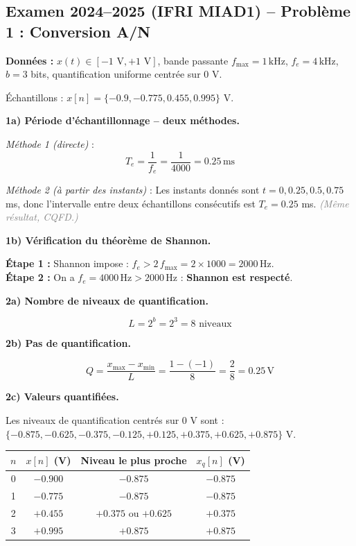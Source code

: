 \documentclass[12pt,a4paper]{article}
\newcommand{\step}[1]{\textcolor{coursbleu}{\textbf{Étape #1 :}}}
\newcommand{\explication}[1]{\textit{\textcolor{gray}{(#1)}}}
\begin{document}
\subsection{Examen 2024--2025 (IFRI MIAD1) -- Problème 1 : Conversion A/N}

\begin{tcolorbox}[corrbox, title=Correction Problème 1]
\textbf{Données :} $x(t) \in [-1\text{ V}, +1\text{ V}]$, bande passante $f_{\max}=1\,\text{kHz}$,
$f_e = 4\,\text{kHz}$, $b = 3$ bits, quantification uniforme centrée sur 0 V.

Échantillons : $x[n] = \{-0.9, -0.775, 0.455, 0.995\}$ V.

\bigskip
\textbf{1a) Période d'échantillonnage -- deux méthodes.}

\textit{Méthode 1 (directe)} :
\[
  T_e = \frac{1}{f_e} = \frac{1}{4000} = 0.25\,\text{ms}
\]

\textit{Méthode 2 (à partir des instants)} :
Les instants donnés sont $t = 0, 0.25, 0.5, 0.75$ ms, donc l'intervalle entre deux
échantillons consécutifs est $T_e = 0.25$ ms. \quad \explication{Même résultat, CQFD.}

\bigskip
\textbf{1b) Vérification du théorème de Shannon.}

\step{1} Shannon impose : $f_e > 2\,f_{\max} = 2 \times 1000 = 2000\,\text{Hz}$.\\
\step{2} On a $f_e = 4000\,\text{Hz} > 2000\,\text{Hz}$ : \textbf{Shannon est respecté}.

\bigskip
\textbf{2a) Nombre de niveaux de quantification.}

\[
  L = 2^b = 2^3 = 8 \text{ niveaux}
\]

\textbf{2b) Pas de quantification.}

\[
  Q = \frac{x_{\max} - x_{\min}}{L} = \frac{1 - (-1)}{8} = \frac{2}{8} = 0.25\,\text{V}
\]

\textbf{2c) Valeurs quantifiées.}

Les niveaux de quantification centrés sur 0 V sont :
$\{-0.875, -0.625, -0.375, -0.125, +0.125, +0.375, +0.625, +0.875\}$ V.

\begin{center}
\renewcommand{\arraystretch}{1.3}
\begin{tabular}{@{}cccc@{}}
\toprule
$n$ & $x[n]$ (V) & Niveau le plus proche & $x_q[n]$ (V)\\
\midrule
0 & $-0.900$ & $-0.875$ & $-0.875$ \\
1 & $-0.775$ & $-0.875$ & $-0.875$ \\
2 & $+0.455$ & $+0.375$ ou $+0.625$ & $+0.375$ \\
3 & $+0.995$ & $+0.875$ & $+0.875$ \\
\bottomrule
\end{tabular}
\end{center}


\end{tcolorbox}
\end{document}
